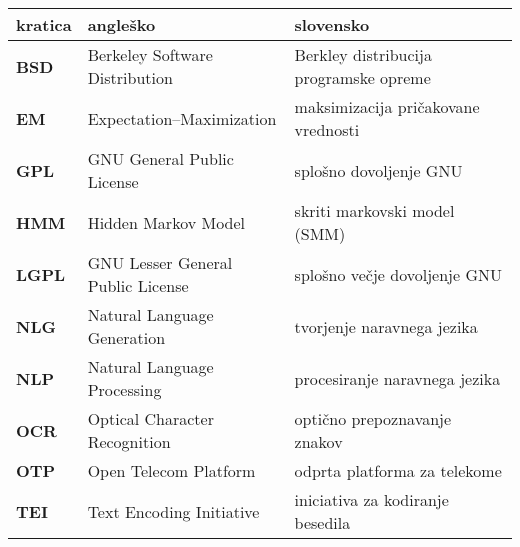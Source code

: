 \begin{tabular}{l|l|l}
  {\bf kratica} & {\bf angleško} & {\bf slovensko} \\
  \hline
  {\bf BSD}  & Berkeley Software Distribution & Berkley distribucija programske opreme \\
  {\bf EM}   & Expectation–Maximization & maksimizacija pričakovane vrednosti \\
  {\bf GPL}  & GNU General Public License & splošno dovoljenje GNU \\
  {\bf HMM}  & Hidden Markov Model & skriti markovski model (SMM) \\
  {\bf LGPL} & GNU Lesser General Public License & splošno večje dovoljenje GNU \\
  {\bf NLG}  & Natural Language Generation & tvorjenje naravnega jezika \\
  {\bf NLP}  & Natural Language Processing & procesiranje naravnega jezika \\
  {\bf OCR}  & Optical Character Recognition & optično prepoznavanje znakov \\
  {\bf OTP}  & Open Telecom Platform & odprta platforma za telekome \\
  {\bf TEI}  & Text Encoding Initiative & iniciativa za kodiranje besedila \\
\end{tabular}
